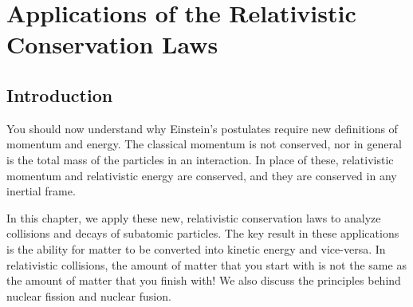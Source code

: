 \chapter[Applications of the Conservation Laws]{Applications of the 
Relativistic Conservation Laws}
\label{chapter:relativity_app}


\section{Introduction}

You should now understand why Einstein's postulates
require new definitions of momentum and energy.  The classical
momentum is not conserved, nor in general is the total mass of the
particles in an interaction.  In place of these, relativistic momentum
and relativistic energy are conserved, and they are conserved in any
inertial frame.  

In this chapter, we apply these new, relativistic conservation laws to 
analyze collisions and decays of subatomic
particles.  The key result in these applications is the ability for
matter to be converted into kinetic energy and vice-versa.  In relativistic
collisions, the amount of matter that you start with is not the same
as the amount of matter that you finish with!  We also discuss the
principles behind nuclear fission and nuclear fusion.

